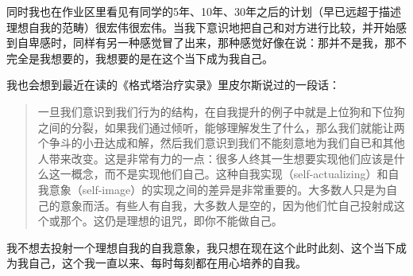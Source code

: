 同时我也在作业区里看见有同学的5年、10年、30年之后的计划（早已远超于描述理想自我的范畴）很宏伟很宏伟。当我下意识地把自己和对方进行比较，并开始感到自卑感时，同样有另一种感觉冒了出来，那种感觉好像在说：那并不是我，那不完全是我想要的，我想要的是在这个当下成为我自己。

我也会想到最近在读的《格式塔治疗实录》里皮尔斯说过的一段话：

\blockquote{一旦我们意识到我们行为的结构，在自我提升的例子中就是上位狗和下位狗之间的分裂，如果我们通过倾听，能够理解发生了什么，那么我们就能让两个争斗的小丑达成和解，然后我们意识到我们不能刻意地为我们自已和其他人带来改变。这是非常有力的一点：很多人终其一生想要实现他们应该是什么这一概念，而不是实现他们自己。这种自我实现（self-actualizing）和自我意象（self-image）的实现之间的差异是非常重要的。大多数人只是为自己的意象而活。有些人有自我，大多数人是空的，因为他们忙自己投射成这个或那个。这仍是理想的诅咒，即你不能做自己。}

我不想去投射一个理想自我的自我意象，我只想在现在这个此时此刻、这个当下成为我自己，这个我一直以来、每时每刻都在用心培养的自我。

